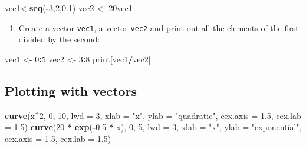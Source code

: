\documentclass[
]{book}
\newenvironment{Shaded}{\begin{snugshade}}{\end{snugshade}}
\newcommand{\DataTypeTok}[1]{\textcolor[rgb]{0.13,0.29,0.53}{#1}}
\newcommand{\DecValTok}[1]{\textcolor[rgb]{0.00,0.00,0.81}{#1}}
\newcommand{\FloatTok}[1]{\textcolor[rgb]{0.00,0.00,0.81}{#1}}
\newcommand{\KeywordTok}[1]{\textcolor[rgb]{0.13,0.29,0.53}{\textbf{#1}}}
\newcommand{\NormalTok}[1]{#1}
\newcommand{\OperatorTok}[1]{\textcolor[rgb]{0.81,0.36,0.00}{\textbf{#1}}}
\newcommand{\StringTok}[1]{\textcolor[rgb]{0.31,0.60,0.02}{#1}}
\providecommand{\tightlist}{%
  \setlength{\itemsep}{0pt}\setlength{\parskip}{0pt}}
\theoremstyle{definition}
\theoremstyle{definition}
\theoremstyle{definition}
\theoremstyle{remark}
\begin{document}
\begin{Shaded}
\begin{Highlighting}[]
\NormalTok{vec1\textless{}{-}}\KeywordTok{seq}\NormalTok{(}\OperatorTok{{-}}\DecValTok{3}\NormalTok{,}\DecValTok{2}\NormalTok{,}\FloatTok{0.1}\NormalTok{)}
\NormalTok{vec2 \textless{}{-}}\StringTok{ }\NormalTok{20vec1}
\end{Highlighting}
\end{Shaded}

\begin{enumerate}
\def\labelenumi{\arabic{enumi}.}
\setcounter{enumi}{6}
\tightlist
\item
  Create a vector \texttt{vec1}, a vector \texttt{vec2} and print out all the elements of the first divided by the second:
\end{enumerate}

\begin{Shaded}
\begin{Highlighting}[]
\NormalTok{vec1 \textless{}{-}}\StringTok{ }\DecValTok{0}\OperatorTok{:}\DecValTok{5}
\NormalTok{vec2 \textless{}{-}}\StringTok{ }\DecValTok{3}\OperatorTok{:}\DecValTok{8}
\NormalTok{print[vec1}\OperatorTok{/}\NormalTok{vec2]}
\end{Highlighting}
\end{Shaded}

\hypertarget{plotting-with-vectors}{%
\subsection{Plotting with vectors}\label{plotting-with-vectors}}

\begin{Shaded}
\begin{Highlighting}[]
\KeywordTok{curve}\NormalTok{(x}\OperatorTok{\^{}}\DecValTok{2}\NormalTok{, }\DecValTok{0}\NormalTok{, }\DecValTok{10}\NormalTok{, }\DataTypeTok{lwd =} \DecValTok{3}\NormalTok{, }\DataTypeTok{xlab =} \StringTok{"x"}\NormalTok{, }\DataTypeTok{ylab =} \StringTok{"quadratic"}\NormalTok{, }
    \DataTypeTok{cex.axis =} \FloatTok{1.5}\NormalTok{, }\DataTypeTok{cex.lab =} \FloatTok{1.5}\NormalTok{)}
\KeywordTok{curve}\NormalTok{(}\DecValTok{20} \OperatorTok{*}\StringTok{ }\KeywordTok{exp}\NormalTok{(}\OperatorTok{{-}}\FloatTok{0.5} \OperatorTok{*}\StringTok{ }\NormalTok{x), }\DecValTok{0}\NormalTok{, }\DecValTok{5}\NormalTok{, }\DataTypeTok{lwd =} \DecValTok{3}\NormalTok{, }\DataTypeTok{xlab =} \StringTok{"x"}\NormalTok{, }
    \DataTypeTok{ylab =} \StringTok{"exponential"}\NormalTok{, }\DataTypeTok{cex.axis =} \FloatTok{1.5}\NormalTok{, }\DataTypeTok{cex.lab =} \FloatTok{1.5}\NormalTok{)}
\end{Highlighting}
\end{Shaded}
\end{document}
